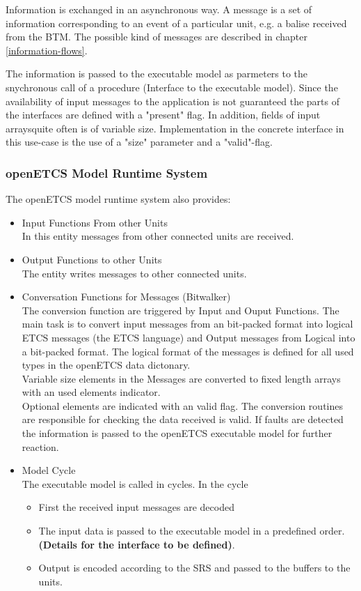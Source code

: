 \documentclass{template/openetcs_report}
\begin{document}
Information  is exchanged  in an asynchronous way. A message is a set
of information corresponding to an event of a particular unit, e.g. a
balise received from the \gls{BTM}. The possible kind of messages are
described in chapter \ref{information-flows}.

The information is passed to the executable model as parmeters to the snychronous call of a procedure (Interface to the executable model). Since the availability of input messages to the application is not guaranteed the parts of the interfaces are defined with a "present" flag. In addition, fields of input arraysquite often is of variable size. Implementation in the concrete interface in this use-case is the use of a "size" parameter and a "valid"-flag.


\subsubsection{openETCS Model Runtime System}
The openETCS model runtime system also provides:

\begin{itemize}
\item Input Functions From other Units\\
In this entity messages from other connected units are received.
\item Output Functions to other Units\\
The entity writes messages to other connected units.
\item Conversation Functions for Messages (Bitwalker)\\
The conversion function are triggered by Input and Ouput Functions. The main task is to convert input messages from an bit-packed format into logical ETCS messages (the ETCS language) and Output messages from Logical into a bit-packed format. The logical format of the messages is defined for all used types in the openETCS data dictonary. \\
Variable size elements in the Messages are converted to fixed length arrays with an used elements indicator.\\
Optional elements are indicated with an valid flag.
The conversion routines are responsible for checking the data received is valid. If  faults are detected the information is passed to the openETCS executable model for further reaction. 
\item Model Cycle\\
The executable model is called in cycles. In the cycle 
\begin{itemize}
\item First the received input messages are decoded
\item The input data is passed to the executable model in a predefined order. \textbf{(Details for the interface to be defined)}.
\item Output is encoded according to the \gls{SRS} and passed to the  buffers to the units.
\end{itemize}
\end{itemize}
\end{document}
